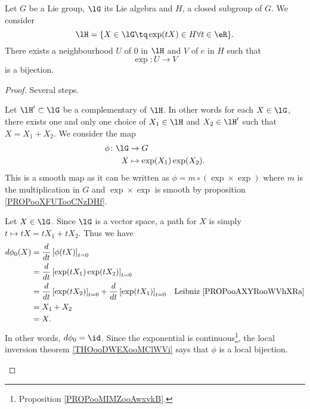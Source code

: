 \begin{lemma}     \label{LEMooNPLBooBrwNWY}
	Let \( G\) be a Lie group, \( \lG\) its Lie algebra and \( H\), a closed subgroup of \( G\). We consider
	\begin{equation}
		\lH=\{ X\in \lG\tq \exp(tX)\in H\forall t\in \eR \}.
	\end{equation}
	There exists a neighbourhood \( U\) of \( 0\) in \( \lH\) and \( V\) of \( e\) in \( H\) such that
	\begin{equation}
		\exp\colon U\to V
	\end{equation}
	is  a bijection.
\end{lemma}

\begin{proof}
	Several steps.
	\begin{subproof}
		Let \( \lH'\subset \lG\) be a complementary of \( \lH\). In other words for each \( X\in \lG\), there exists one and only one choice of \( X_1\in \lH\) and \( X_2\in \lH'\) such that \( X=X_1+X_2\). We consider the map
		\begin{equation}
			\begin{aligned}
				\phi\colon \lG & \to G                       \\
				X              & \mapsto \exp(X_1)\exp(X_2).
			\end{aligned}
		\end{equation}
		This is a smooth map as it can be written as \( \phi=m\circ(\exp\times \exp)\) where \( m\) is the multiplication in \( G\) and \( \exp\times\exp\) is smooth by proposition \ref{PROPooXFUTooCNzDHf}.

		Let \( X\in\lG\). Since \( \lG\) is a vector space, a path for \( X\) is simply \( t\mapsto tX=tX_1+tX_2\). Thus we have
		\begin{subequations}
			\begin{align}
				d\phi_0(X) & =\frac{d}{dt} \left[ \phi(tX)  \right]_{t=0}                                                                                           \\
				           & =\frac{d}{dt} \left[ \exp(tX_1)\exp(tX_2)  \right]_{t=0}                                                                               \\
				           & =\frac{d}{dt} \left[ \exp(tX_2)  \right]_{t=0}+\frac{d}{dt} \left[ \exp(tX_1)  \right]_{t=0} & \text{Leibniz \ref{PROPooAXYRooWVhXRa}} \\
				           & =X_1+X_2                                                                                                                               \\
				           & =X.
			\end{align}
		\end{subequations}
		In other words, \( d\phi_0=\id\). Since the exponential is continuous\footnote{Proposition \ref{PROPooMIMZooAwxvkB}.}, the local inversion theorem \ref{THOooDWEXooMClWVi} says that \( \phi\) is a local bijection.


\end{subproof}
\end{proof}
